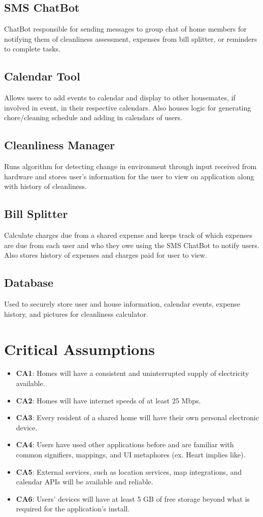 \documentclass{article}
\begin{document}
\subsection{SMS ChatBot}
ChatBot responsible for sending messages to group chat of home members for notifying them of cleanliness assessment, expenses from bill splitter, or reminders to complete tasks.

\subsection{Calendar Tool}
Allows users to add events to calendar and display to other housemates, if involved in event, in their respective calendars. Also houses logic for generating chore/cleaning schedule and adding in calendars of users.

\subsection{Cleanliness Manager}
Runs algorithm for detecting change in environment through input received from hardware and stores user's information for the user to view on application along with history of cleanliness.

\subsection{Bill Splitter}
Calculate charges due from a shared expense and keeps track of which expenses are due from each user and who they owe using the SMS ChatBot to notify users. Also stores history of expenses and charges paid for user to view.

\subsection{Database}
Used to securely store user and house information, calendar events, expense history, and pictures for cleanliness calculator.


\section{Critical Assumptions}

\begin{itemize}
\item \textbf{CA1}: Homes will have a consistent and uninterrupted supply of electricity available.
\item \textbf{CA2}: Homes will have internet speeds of at least 25 Mbps.
\item \textbf{CA3}: Every resident of a shared home will have their own personal electronic device.
\item \textbf{CA4}: Users have used other applications before and are familiar with common signifiers, mappings, and UI metaphores (ex. Heart implies like).
\item \textbf{CA5}: External services, such as location services, map integrations, and calendar APIs will be available and reliable.
\item \textbf{CA6}: Users' devices will have at least 5 GB of free storage beyond what is required for the application's install.
\end{itemize}
\end{document}
